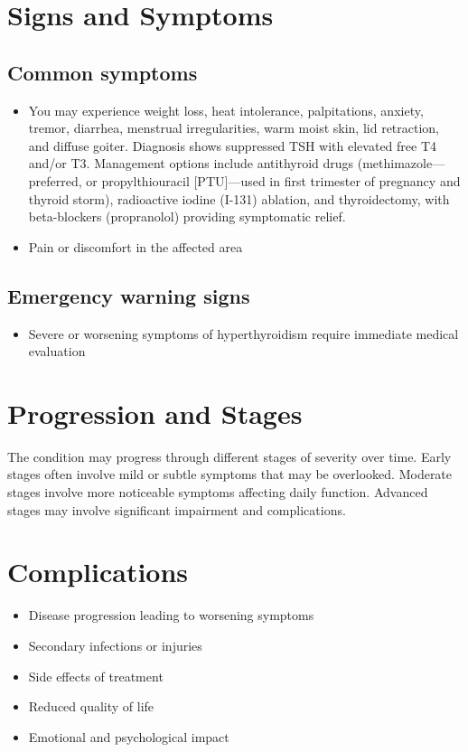 \section{Signs and Symptoms}
\subsection{Common symptoms}
\begin{itemize}[noitemsep]
  \item You may experience weight loss, heat intolerance, palpitations, anxiety, tremor, diarrhea, menstrual irregularities, warm moist skin, lid retraction, and diffuse goiter. Diagnosis shows suppressed TSH with elevated free T4 and/or T3. Management options include antithyroid drugs (methimazole---preferred, or propylthiouracil [PTU]---used in first trimester of pregnancy and thyroid storm), radioactive iodine (I-131) ablation, and thyroidectomy, with beta-blockers (propranolol) providing symptomatic relief.
  \item Pain or discomfort in the affected area
  \end{itemize}
\subsection{Emergency warning signs}
\begin{itemize}[noitemsep]
  \item Severe or worsening symptoms of hyperthyroidism require immediate medical evaluation
\end{itemize}
\section{Progression and Stages}
The condition may progress through different stages of severity over time. Early stages often involve mild or subtle symptoms that may be overlooked. Moderate stages involve more noticeable symptoms affecting daily function. Advanced stages may involve significant impairment and complications.
\section{Complications}
\begin{itemize}[noitemsep]
  \item Disease progression leading to worsening symptoms
  \item Secondary infections or injuries
  \item Side effects of treatment
  \item Reduced quality of life
  \item Emotional and psychological impact
\end{itemize}
